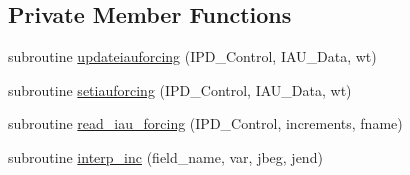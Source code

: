 \subsection*{Private Member Functions}
\begin{DoxyCompactItemize}
\item 
subroutine \hyperlink{classfv__iau__mod_a6c82860ced03945e7efa22f4a80c2eb4}{updateiauforcing} (I\-P\-D\-\_\-\-Control, I\-A\-U\-\_\-\-Data, wt)
\item 
subroutine \hyperlink{classfv__iau__mod_a5701c1ca8d6df61a85cf83e808fc8962}{setiauforcing} (I\-P\-D\-\_\-\-Control, I\-A\-U\-\_\-\-Data, wt)
\item 
subroutine \hyperlink{classfv__iau__mod_a6fe83e01a0384b0391fd77833e4281c9}{read\-\_\-iau\-\_\-forcing} (I\-P\-D\-\_\-\-Control, increments, fname)
\item 
subroutine \hyperlink{classfv__iau__mod_a96c143c7c507b624327f7b0c45a7492e}{interp\-\_\-inc} (field\-\_\-name, var, jbeg, jend)
\end{DoxyCompactItemize}
